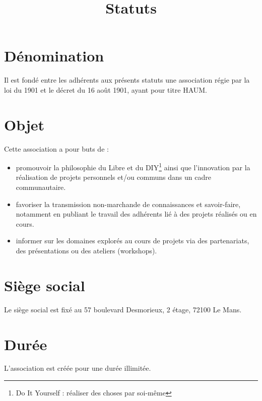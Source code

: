 \documentclass[a4paper, 11pt]{article}
\title{Statuts}
\author{}
\date{}
\newcommand{\nomHS}{HAUM}
\begin{document}
    \maketitle

\section{Dénomination} %

Il est fondé entre les adhérents aux présents statuts une association régie par la loi du 1901 et le décret du 16 août
1901, ayant pour titre \og{}\nomHS\fg{}.


\section{Objet} %

Cette association a pour buts de :

\begin{itemize}
    \item promouvoir la philosophie du Libre et du DIY\footnote{Do It Yourself : réaliser des choses par
        soi-même} ainsi que l'innovation par la réalisation de projets personnels et/ou communs dans un cadre
        communautaire.
    \item favoriser la transmission non-marchande de connaissances et savoir-faire, notamment en publiant le travail des
        adhérents lié à des projets réalisés ou en cours.
    \item informer sur les domaines explorés au cours de projets via des partenariats, des présentations ou des ateliers
        (workshops).
\end{itemize}


\section{Siège social} %

Le siège social est fixé au 57 boulevard Desmorieux, 2 étage, 72100 Le Mans.


\section{Durée} %

L'association est créée pour une durée illimitée.

\end{document}

